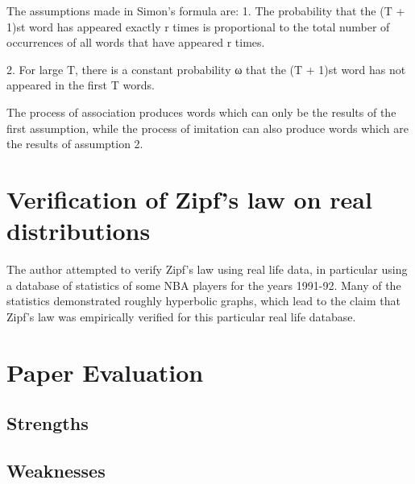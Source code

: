 \documentclass{article}
\begin{document}
The assumptions made in Simon's formula are:
1. The probability that the (T + 1)st word has appeared exactly r
times is proportional to the total number of occurrences of all words
that have appeared r times.

2. For large T, there is a constant probability ω that the (T + 1)st
word has not appeared in the first T words. 

The process of association produces words which can only be the
results of the first assumption, while the process of imitation can
also produce words which are the results of assumption 2.

\section{Verification of Zipf's law on real distributions}

The author attempted to verify Zipf's law using real life data, in
particular using a database of statistics of some NBA players for the
years 1991-92. Many of the statistics demonstrated roughly hyperbolic
graphs, which lead to the claim that Zipf's law was empirically
verified for this particular real life database.

\section{Paper Evaluation}
\subsection{Strengths}

\subsection{Weaknesses}
\end{document}
